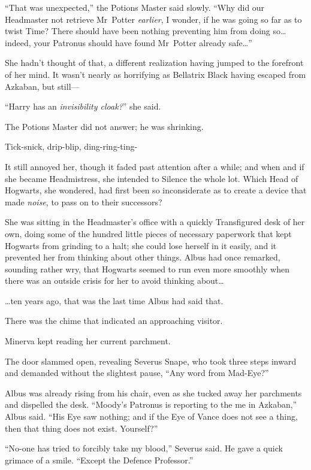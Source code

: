 “That was unexpected,” the Potions Master said slowly. “Why did our Headmaster not retrieve Mr~Potter \emph{earlier}, I wonder, if he was going so far as to twist Time? There should have been nothing preventing him from doing so…indeed, your Patronus should have found Mr~Potter already safe…”

She hadn’t thought of that, a different realization having jumped to the forefront of her mind. It wasn’t nearly as horrifying as Bellatrix Black having escaped from Azkaban, but still—

“Harry has an \emph{invisibility cloak?}” she said.

The Potions Master did not answer; he was shrinking.

\later

Tick-snick, drip-blip, ding-ring-ting-

It still annoyed her, though it faded past attention after a while; and when and if she became Headmistress, she intended to Silence the whole lot. Which Head of Hogwarts, she wondered, had first been so inconsiderate as to create a device that made \emph{noise}, to pass on to their successors?

She was sitting in the Headmaster’s office with a quickly Transfigured desk of her own, doing some of the hundred little pieces of necessary paperwork that kept Hogwarts from grinding to a halt; she could lose herself in it easily, and it prevented her from thinking about other things. Albus had once remarked, sounding rather wry, that Hogwarts seemed to run even more smoothly when there was an outside crisis for her to avoid thinking about…

…ten years ago, that was the last time Albus had said that.

There was the chime that indicated an approaching visitor.

Minerva kept reading her current parchment.

The door slammed open, revealing Severus Snape, who took three steps inward and demanded without the slightest pause, “Any word from Mad-Eye?”

Albus was already rising from his chair, even as she tucked away her parchments and dispelled the desk. “Moody’s Patronus is reporting to the me in Azkaban,” Albus said. “His Eye saw nothing; and if the Eye of Vance does not see a thing, then that thing does not exist. Yourself?”

“No-one has tried to forcibly take my blood,” Severus said. He gave a quick grimace of a smile. “Except the Defence Professor.”

